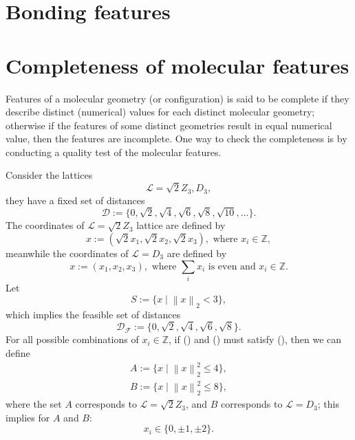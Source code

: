 \documentclass[12pt]{article}
\begin{document}
\section{Bonding features}
\label{sec:bondingfeature}

\section{Completeness of molecular features}
Features of a molecular geometry (or configuration) is said to be complete if they describe distinct (numerical) values for each distinct molecular geometry; otherwise if the features of some distinct geometries result in equal numerical value, then the features are incomplete. One way to check the completeness is by conducting a quality test of the molecular features.

Consider the lattices
\begin{equation}
    \mathcal{L} = \sqrt{2}Z_3, D_3,
\end{equation}
they have a fixed set of distances
\begin{equation}
    \mathcal{D} := \{0, \sqrt{2}, \sqrt{4}, \sqrt{6}, \sqrt{8}, \sqrt{10}, ...\}.
\end{equation}
The coordinates of $\mathcal{L} = \sqrt{2}Z_3$ lattice are defined by
\begin{equation}
    x:= (\sqrt{2}x_1, \sqrt{2}x_2, \sqrt{2}x_3), \text{ where } x_i \in \mathbb{Z},
    \label{eq:completeness_Z_set}
\end{equation}
meanwhile the coordinates of $\mathcal{L} = D_3$ are defined by
\begin{equation}
    x:= (x_1, x_2, x_3), \text{ where } \sum_i x_i \text{ is even and } x_i \in \mathbb{Z}.
    \label{eq:completeness_D_set}
\end{equation}
Let
\begin{equation}
    S := \{x \mid \left\| x\right\|_2 < 3 \},
    \label{eq:completeness_distance_set}
\end{equation}
which implies the feasible set of distances
\begin{equation}
    \mathcal{D_F} := \{0, \sqrt{2}, \sqrt{4}, \sqrt{6}, \sqrt{8}\}.
\end{equation}
For all possible combinations of $x_i \in \mathbb{Z}$, if () and () must satisfy (), then we can define
\begin{equation}
    \begin{split}
        A:= \{ x \mid \left\| x \right\|_2^2 \leq 4\}, \\
        B:= \{ x \mid \left\| x \right\|_2^2 \leq 8\},
    \end{split}
    \label{eq:completeness_lattice_set}
\end{equation}
where the set $A$ corresponds to $\mathcal{L} = \sqrt{2}Z_3$, and $B$ corresponds to $\mathcal{L} = D_3$; this implies for $A$ and $B$:
\begin{equation}
    x_i \in \{0, \pm 1, \pm 2\}.
\end{equation}
\end{document}
